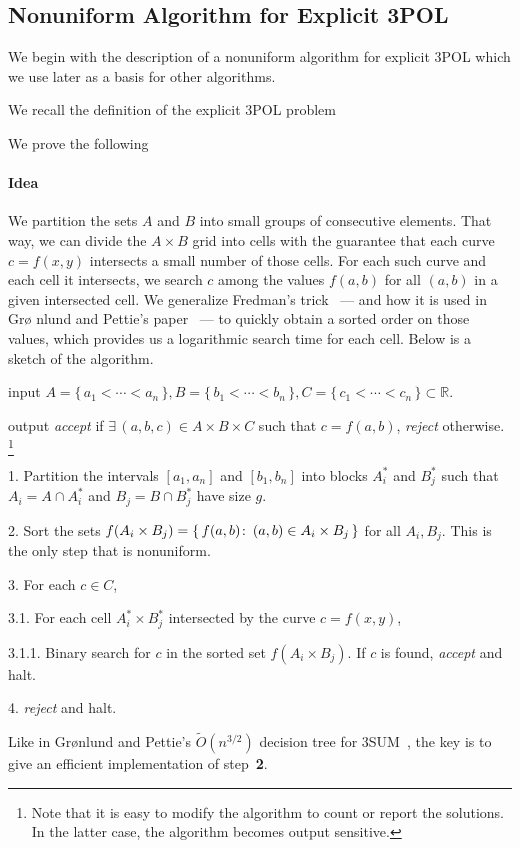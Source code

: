 \subsection{Nonuniform Algorithm for Explicit 3POL}%
\label{sec:algo:explicit:nonuniform}

We begin with the description of a nonuniform algorithm for explicit 3POL which
we use later as a basis for other algorithms.

We recall the definition of the explicit 3POL problem
%
\ProblemPOLExplicit*

We prove the following
\restate{\TheoremPOLNonuniformExplicit*}

\paragraph{Idea}
We partition the sets $A$ and $B$ into small groups of consecutive
elements. That way, we can divide the $A\times B$ grid into cells with the
guarantee that each curve $c = f(x,y)$ intersects a small number
of those cells. For each such curve and each cell it intersects, we
search $c$ among the values $f(a,b)$ for all $(a,b)$ in a given intersected
cell. We generalize Fredman's trick~\cite{Fr76} --- and how it is used in Gr\o
nlund and Pettie's paper~\cite{GP18} --- to quickly obtain a sorted order on
those values, which provides us a logarithmic search time for each cell.
Below is a sketch of the algorithm.
\begin{algorithm}\label{algo:ne}
\item[input] $A = \{\,a_1 < \cdots < a_n\,\},B = \{\,b_1<\cdots<b_n\,\},
    C = \{\,c_1<\cdots<c_n\,\}
    \subset \mathbb{R}$.
\item[output] \emph{accept} if $\exists\, (a,b,c) \in A \times B \times C$ such that $c
    = f(a,b)$, \emph{reject} otherwise.%
    \footnote{Note that it is easy to modify the algorithm to count or report the
    solutions. In the latter case, the algorithm becomes output sensitive.}
\item[1.] Partition the intervals $[a_1,a_n]$ and $[b_1,b_n]$ into blocks
    $A_i^*$ and $B_j^*$ such that $A_i = A \cap A_i^*$ and $B_j = B
    \cap B_j^*$ have size $g$.
\item[2.] Sort the sets $f(A_i \times B_j) = \{\, f(a,b) \colon\, (a,b) \in A_i
    \times B_j\,\}$ for all $A_i,B_j$. This is the only step that
    is nonuniform.
\item[3.] For each $c \in C$,
\item[3.1.] For each cell $A_i^* \times B_j^*$ intersected by the curve
$c=f(x,y)$,
\item[3.1.1.] Binary search for $c$ in the sorted set $f(A_i \times B_j)$.
If $c$ is found, \emph{accept} and halt.
\item[4.] \emph{reject} and halt.
\end{algorithm}
%
Like in Gr\o nlund and Pettie's $\tilde{O}(n^{3/2})$ decision tree for
3SUM~\cite{GP18}, the key is to give an efficient implementation
of step~\textbf{2}.

